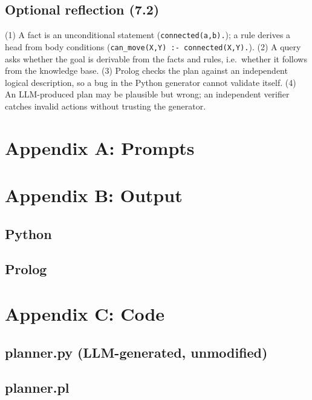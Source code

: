 \documentclass[10pt,a4paper]{article}
\begin{document}
\subsection*{Optional reflection (7.2)}
(1) A fact is an unconditional statement (\texttt{connected(a,b).}); a rule derives a head from body conditions (\texttt{can\_move(X,Y) :- connected(X,Y).}). (2) A query asks whether the goal is derivable from the facts and rules, i.e.\ whether it follows from the knowledge base. (3) Prolog checks the plan against an independent logical description, so a bug in the Python generator cannot validate itself. (4) An LLM-produced plan may be plausible but wrong; an independent verifier catches invalid actions without trusting the generator.

\section*{Appendix A: Prompts}
\section*{Appendix B: Output}
\subsection*{Python}
\subsection*{Prolog}
\section*{Appendix C: Code}
\subsection*{planner.py (LLM-generated, unmodified)}
\subsection*{planner.pl}
\end{document}
